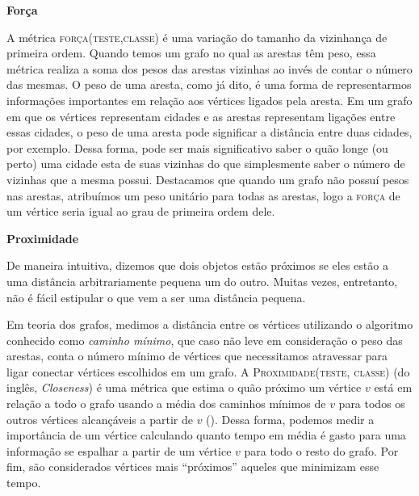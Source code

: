 \begin{description}
\item{\textbf{Força}}
\label{item::strength}

A métrica \textsc{força(teste,classe)} é uma variação do tamanho da vizinhança de primeira ordem. Quando temos um grafo no qual as arestas têm peso, essa métrica realiza a soma dos pesos das arestas vizinhas ao invés de contar o número das mesmas. O peso de uma aresta, como já dito, é uma forma de representarmos informações importantes em relação aos vértices ligados pela aresta. Em um grafo em que os vértices representam cidades e as arestas representam ligações entre essas cidades, o peso de uma aresta pode significar a distância entre duas cidades, por exemplo. Dessa forma, pode ser mais significativo saber o quão longe (ou perto) uma cidade esta de suas vizinhas do que simplesmente saber o número de vizinhas que a mesma possui.
Destacamos que quando um grafo não possuí pesos nas arestas, atribuímos um peso unitário para todas as arestas, logo a \textsc{força} de um vértice seria igual ao grau de primeira ordem dele.

\item{\textbf{Proximidade}}
\label{item::closeness}

De maneira intuitiva, dizemos que dois objetos estão próximos se eles estão a uma distância arbitrariamente pequena um do outro. Muitas vezes, entretanto, não é fácil estipular o que vem a ser uma distância pequena. 

Em teoria dos grafos, medimos a distância entre os vértices utilizando o algoritmo conhecido como \textit{caminho mínimo}, que caso não leve em consideração o peso das arestas, conta o número mínimo de vértices que necessitamos atravessar para ligar conectar vértices escolhidos em um grafo. A \textsc{Proximidade(teste, classe)} (do inglês, \textit{Closeness}) é uma métrica que estima o quão próximo um vértice $v$ está em relação a todo o grafo usando a média dos caminhos mínimos de $v$ para todos os outros vértices alcançáveis a partir de $v$ (\cite{Beauchamp65}). Dessa forma, podemos medir a importância de um vértice calculando quanto tempo em média é gasto para uma informação se espalhar a partir de um vértice $v$ para todo o resto do grafo. Por fim, são considerados vértices mais ``próximos'' aqueles que minimizam esse tempo.


\end{description}
